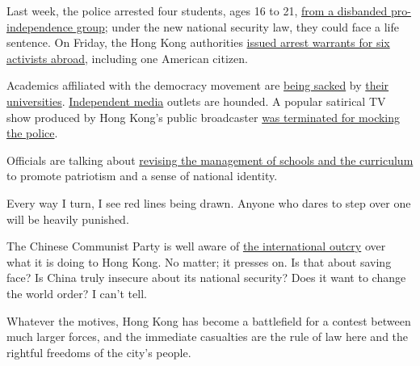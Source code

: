 Last week, the police arrested four students, ages 16 to 21,
\href{https://www.scmp.com/news/hong-kong/law-and-crime/article/3095240/least-three-core-members-hong-kong-pro-independence}{from
a disbanded pro-independence group}; under the new national security
law, they could face a life sentence. On Friday, the Hong Kong
authorities
\href{https://www.nytimes.com/reuters/2020/07/31/world/asia/31reuters-hongkong-security-exiles.html?searchResultPosition=9}{issued
arrest warrants for six activists abroad}, including one American
citizen.

Academics affiliated with the democracy movement are
\href{https://www.nytimes.com/2020/07/28/world/asia/benny-tai-hong-kong-university.html?campaign_id=7\&emc=edit_MBAE_p_20200728\&instance_id=20720\&nl=morning-briefing\&regi_id=65413713\&section=whatElse\&segment_id=34578\&te=1\&user_id=bd32fbf008e5183a7928ed61}{being
sacked} by
\href{https://www.scmp.com/news/hong-kong/politics/article/3046632/occupy-ringleader-shiu-ka-chun-accuses-hong-kong-university}{their
universities}.
\href{https://www.scmp.com/news/hong-kong/law-and-crime/article/3092957/hong-kong-media-tycoon-jimmy-lai-and-12-others-face}{Independent
media} outlets are hounded. A popular satirical TV show produced by Hong
Kong's public broadcaster
\href{https://hongkongfp.com/2020/05/19/hong-kong-public-broadcaster-axes-satirical-show-hours-after-govt-demands-apology-for-insulting-police/}{was
terminated for mocking the police}.

Officials are talking about
\href{https://www.scmp.com/news/hong-kong/education/article/3095434/hong-kong-national-security-law-schools-get-new-teaching}{revising
the management of schools and the curriculum} to promote patriotism and
a sense of national identity.

Every way I turn, I see red lines being drawn. Anyone who dares to step
over one will be heavily punished.

The Chinese Communist Party is well aware of
\href{https://www.state.gov/on-the-postponement-of-hong-kongs-legislative-council-elections/}{the
international outcry} over what it is doing to Hong Kong. No matter; it
presses on. Is that about saving face? Is China truly insecure about its
national security? Does it want to change the world order? I can't tell.

Whatever the motives, Hong Kong has become a battlefield for a contest
between much larger forces, and the immediate casualties are the rule of
law here and the rightful freedoms of the city's people.

